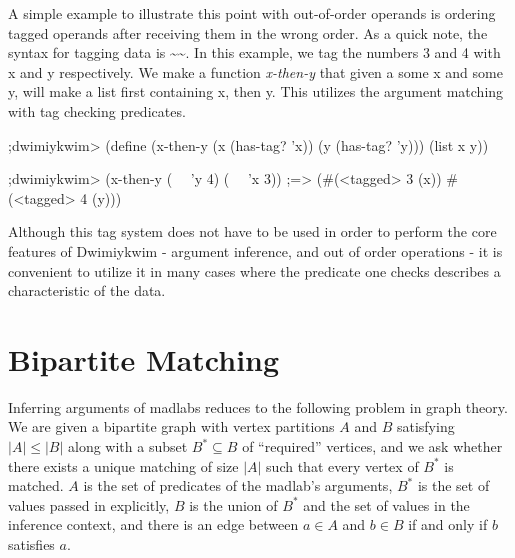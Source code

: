 \documentclass[11pt]{article}
\begin{document}
A simple example to illustrate this point with out-of-order operands
is ordering tagged operands after receiving them in the wrong order.
As a quick note, the syntax for tagging data is \textasciitilde\textasciitilde.
In this example, we tag the numbers 3 and 4 with x and y respectively.
We make a function \textit{x-then-y} that given a some x and some y,
will make a list first containing x, then y. 
This utilizes the argument matching with tag checking predicates.

\begin{verbbox}
;dwimiykwim>
(define (x-then-y (x (has-tag? 'x)) (y (has-tag? 'y)))
  (list x y))

;dwimiykwim>
(x-then-y (~~ 'y 4) (~~ 'x 3))
;=> (#(<tagged> 3 (x)) #(<tagged> 4 (y)))
\end{verbbox}
\begin{center}\theverbbox\end{center}

Although this tag system does not have to be used in order to perform
the core features of Dwimiykwim - argument inference,
and out of order operations - it is convenient to utilize it
in many cases where the predicate one checks
describes a characteristic of the data.

\section{Bipartite Matching}\label{bipartite}

Inferring arguments of madlabs
reduces to the following problem in graph theory.
We are given a bipartite graph with vertex partitions $A$ and $B$
satisfying $|A| \leq |B|$
along with a subset $B^* \subseteq B$ of ``required'' vertices,
and we ask whether there exists a unique matching of size $|A|$
such that every vertex of $B^*$ is matched.
$A$ is the set of predicates of the madlab's arguments,
$B^*$ is the set of values passed in explicitly,
$B$ is the union of $B^*$ and the set of values in the inference context,
and there is an edge between $a \in A$ and $b \in B$
if and only if $b$ satisfies $a$.
\end{document}
